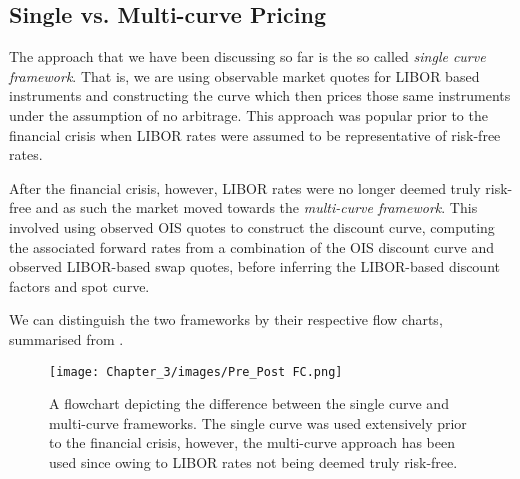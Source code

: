 \vspace{0.5cm}

\subsection{Single vs. Multi-curve Pricing}
The approach that we have been discussing so far is the so called \textit{single curve framework}. That is, we are using observable market quotes for LIBOR based instruments and constructing the curve which then prices those same instruments under the assumption of no arbitrage. This approach was popular prior to the financial crisis when LIBOR rates were assumed to be representative of risk-free rates.

After the financial crisis, however, LIBOR rates were no longer deemed truly risk-free and as such the market moved towards the \textit{multi-curve framework}. This involved using observed OIS quotes to construct the discount curve, computing the associated forward rates from a combination of the OIS discount curve and observed LIBOR-based swap quotes, before inferring the LIBOR-based discount factors and spot curve.

We can distinguish the two frameworks by their respective flow charts, summarised from \cite{veronesi2016handbook}.

\begin{figure}[ht]
\begin{center}
\texttt{[image: Chapter\_3/images/Pre\_Post FC.png]}
\caption[Comparison of single and multi-curve frameworks]{A flowchart depicting the difference between the single curve and multi-curve frameworks. The single curve was used extensively prior to the financial crisis, however, the multi-curve approach has been used since owing to LIBOR rates not being deemed truly risk-free.}
\label{fig:pre_post}
\end{center}
\end{figure}
